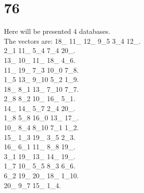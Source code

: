 \chapter{76}
\indent Here will be presented 4 databases.\\
The vectors are:
18\_ 11\_ 12\_ 9\_5 3\_4 12\_.\\2\_1 11\_ 5\_4 7\_4 20\_.\\13\_ 10\_ 11\_ 18\_ 4\_6.\\11\_ 19\_ 7\_3 10\_0 7\_8.\\1\_5 13\_ 9\_10 5\_2 1\_9.\\18\_ 8\_1 13\_ 7\_10 7\_7.\\2\_8 8\_2 10\_ 16\_ 5\_1.\\14\_ 14\_ 5\_7 2\_4 20\_.\\1\_8 5\_8 16\_0 13\_ 17\_.\\10\_ 8\_4 8\_10 7\_1 1\_2.\\15\_ 1\_3 19\_ 3\_5 2\_3.\\16\_ 6\_1 11\_ 8\_8 19\_.\\3\_1 19\_ 13\_ 14\_ 19\_.\\1\_7 10\_ 5\_5 8\_3 6\_6.\\6\_2 19\_ 20\_ 18\_ 1\_10.\\20\_ 9\_7 15\_ 1\_4.\\